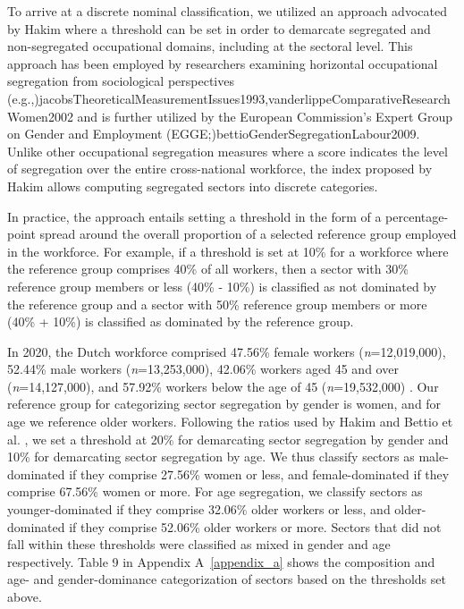 \documentclass[Royal,sageapa,times]{sagej}
\begin{document}
To arrive at a discrete nominal classification, we utilized an approach advocated by Hakim \citeyear{hakimSegregatedIntegratedOccupations1993} where a threshold can be set in order to demarcate segregated and non-segregated occupational domains, including at the sectoral level. This approach has been employed by researchers examining horizontal occupational segregation from sociological perspectives \shortcite(e.g.,){jacobsTheoreticalMeasurementIssues1993,vanderlippeComparativeResearchWomen2002} and is further utilized by the European Commission’s Expert Group on Gender and Employment \shortcite(EGGE;){bettioGenderSegregationLabour2009}. Unlike other occupational segregation measures where a score indicates the level of segregation over the entire cross-national workforce, the index proposed by Hakim allows computing segregated sectors into discrete categories.

In practice, the approach entails setting a threshold in the form of a percentage-point spread around the overall proportion of a selected reference group employed in the workforce. For example, if a threshold is set at 10\% for a workforce where the reference group comprises 40\% of all workers, then a sector with 30\% reference group members or less (40\% - 10\%) is classified as not dominated by the reference group and a sector with 50\% reference group members or more (40\% + 10\%) is classified as dominated by the reference group.

In 2020, the Dutch workforce comprised 47.56\% female workers (\textit{n}=12,019,000), 52.44\% male workers (\textit{n}=13,253,000), 42.06\% workers aged 45 and over (\textit{n}=14,127,000), and 57.92\% workers below the age of 45 (\textit{n}=19,532,000) . Our reference group for categorizing sector segregation by gender is women, and for age we reference older workers. Following the ratios used by Hakim \citeyear{hakimSegregatedIntegratedOccupations1993} and Bettio et al. \citeyear{bettioGenderSegregationLabour2009}, we set a threshold at 20\% for demarcating sector segregation by gender and 10\% for demarcating sector segregation by age. We thus classify sectors as male-dominated if they comprise 27.56\% women or less, and female-dominated if they comprise 67.56\% women or more. For age segregation, we classify sectors as younger-dominated if they comprise 32.06\% older workers or less, and older-dominated if they comprise 52.06\% older workers or more. Sectors that did not fall within these thresholds were classified as mixed in gender and age respectively. Table 9 in Appendix A~\ref{appendix_a} shows the composition and age- and gender-dominance categorization of sectors based on the thresholds set above.
\end{document}
